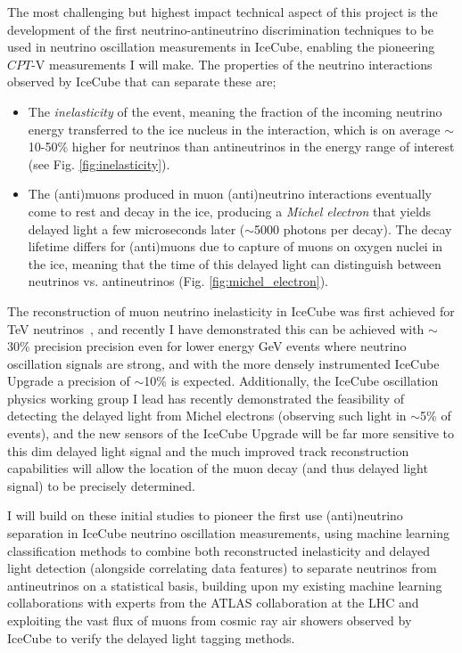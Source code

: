 \documentclass[a4paper,11pt]{article}
\begin{document}
The most challenging but highest impact technical aspect of this project is the development of the first neutrino-antineutrino discrimination techniques to be used in neutrino oscillation measurements in IceCube, enabling the pioneering $CPT$-V measurements I will make. The properties of the neutrino interactions observed by IceCube that can separate these are;

\begin{itemize}
    \item The \textit{inelasticity} of the event, meaning the fraction of the incoming neutrino energy transferred to the ice nucleus in the interaction, which is on average $\sim$10-50\%  higher for neutrinos than antineutrinos in the energy range of interest (see Fig. \ref{fig:inelasticity}).
    \item The (anti)muons produced in muon (anti)neutrino interactions eventually come to rest and decay in the ice, producing a \textit{Michel electron} that yields delayed light a few microseconds later ($\sim$5000 photons per decay). The decay lifetime differs for (anti)muons due to capture of muons on oxygen nuclei in the ice, meaning that the time of this delayed light can distinguish between neutrinos vs. antineutrinos (Fig. \ref{fig:michel_electron}). 
\end{itemize}

The reconstruction of muon neutrino inelasticity in IceCube was first achieved for TeV neutrinos~\cite{Aartsen:2018vez}, and recently I have demonstrated this can be achieved with $\sim$30\% precision precision even for lower energy GeV events where neutrino oscillation signals are strong, and with the more densely instrumented IceCube Upgrade a precision of $\sim$10\% is expected. Additionally, the IceCube oscillation physics working group I lead has recently demonstrated the feasibility of detecting the delayed light from Michel electrons (observing such light in $\sim$5\% of events), and the new sensors of the IceCube Upgrade will be far more sensitive to this dim delayed light signal and the much improved track reconstruction capabilities will allow the location of the muon decay (and thus delayed light signal) to be precisely determined. 

I will build on these initial studies to pioneer the first use (anti)neutrino separation in IceCube neutrino oscillation measurements, using machine learning classification methods to combine both reconstructed inelasticity and delayed light detection (alongside correlating data features) to separate neutrinos from antineutrinos on a statistical basis, building upon my existing machine learning collaborations with experts from the ATLAS collaboration at the LHC and exploiting the vast flux of muons from cosmic ray air showers observed by IceCube to verify the delayed light tagging methods.
\end{document}
